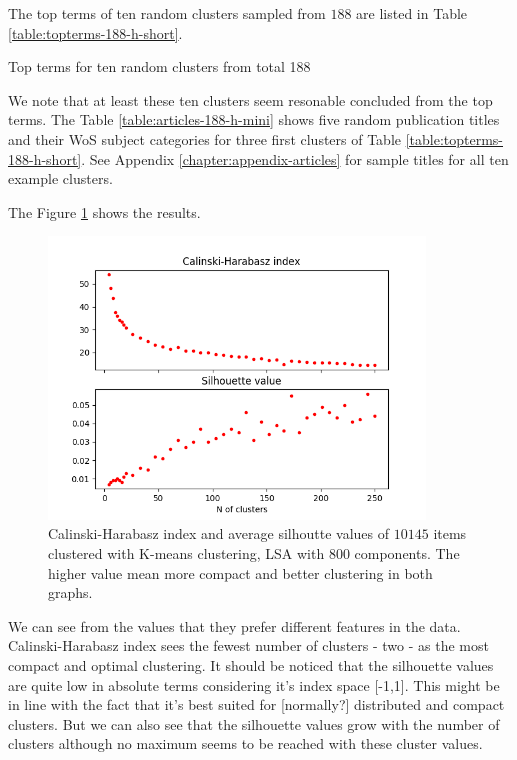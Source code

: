 The top terms of ten random clusters sampled from $188$ are listed
in Table \ref{table:topterms-188-h-short}.
\begin{table}[htp]
  \begin{center}
    
    \caption{Top terms for ten random clusters from total 188}
    \label{table:topterms-188-h-short}    
 \end{center}
\end{table}
We note that at least these ten clusters seem resonable concluded
from the top terms. The Table \ref{table:articles-188-h-mini} 
shows five random publication titles and their WoS subject 
categories for three first clusters of Table \ref{table:topterms-188-h-short}. 
See Appendix \ref{chapter:appendix-articles} for sample titles for
all ten example clusters.
\newpage



The Figure \ref{fig:ch-silh-full-h} shows the results.
\begin{figure}[ht]
  \begin{center}    
\includegraphics[width=10cm]{images/c-h-silh-index-plot-y2000-2_260-800-kmeans.png}
  \caption{Calinski-Harabasz index and average silhoutte values of $10145$
  items clustered with K-means clustering, LSA with 800 components. 
  The higher value mean more compact and better clustering in both graphs.}
    \label{fig:ch-silh-full-h}
  \end{center}
\end{figure}

We can see from the values that they prefer different features in
the data. Calinski-Harabasz index sees the fewest number of 
clusters - two - as the most compact and optimal clustering. 
It should be noticed that the silhouette values are quite low 
in absolute terms considering it's index space [-1,1]. This might 
be in line with the fact that it's best suited for [normally?] 
distributed and compact clusters. But we can also see that the 
silhouette values grow with the number of clusters although no
maximum seems to be reached with these cluster values.


